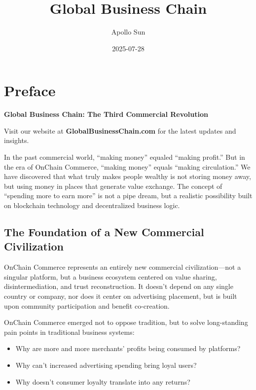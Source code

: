 \documentclass[
  Letterpaper,
]{scrbook}
\title{Global Business Chain}
\author{Apollo Sun}
\date{2025-07-28}
\providecommand{\tightlist}{%
  \setlength{\itemsep}{0pt}\setlength{\parskip}{0pt}}
\renewcommand*\contentsname{Table of contents}
\newcommand\contentsname{Table of contents}
\begin{document}
\frontmatter
\maketitle

\renewcommand*\contentsname{Table of contents}
{
\setcounter{tocdepth}{1}
\tableofcontents
}

\mainmatter
{}

\chapter*{Preface}\label{preface}


\textbf{Global Business Chain: The Third Commercial Revolution}

Visit our website at \textbf{GlobalBusinessChain.com} for the latest
updates and insights.

In the past commercial world, ``making money'' equaled ``making
profit.'' But in the era of OnChain Commerce, ``making money'' equals
``making circulation.'' We have discovered that what truly makes people
wealthy is not storing money away, but using money in places that
generate value exchange. The concept of ``spending more to earn more''
is not a pipe dream, but a realistic possibility built on blockchain
technology and decentralized business logic.

\section*{The Foundation of a New Commercial
Civilization}\label{the-foundation-of-a-new-commercial-civilization}


OnChain Commerce represents an entirely new commercial
civilization---not a singular platform, but a business ecosystem
centered on value sharing, disintermediation, and trust reconstruction.
It doesn't depend on any single country or company, nor does it center
on advertising placement, but is built upon community participation and
benefit co-creation.

OnChain Commerce emerged not to oppose tradition, but to solve
long-standing pain points in traditional business systems:

\begin{itemize}
\tightlist
\item
  Why are more and more merchants' profits being consumed by platforms?
\item
  Why can't increased advertising spending bring loyal users?
\item
  Why doesn't consumer loyalty translate into any returns?
\end{itemize}
\end{document}
